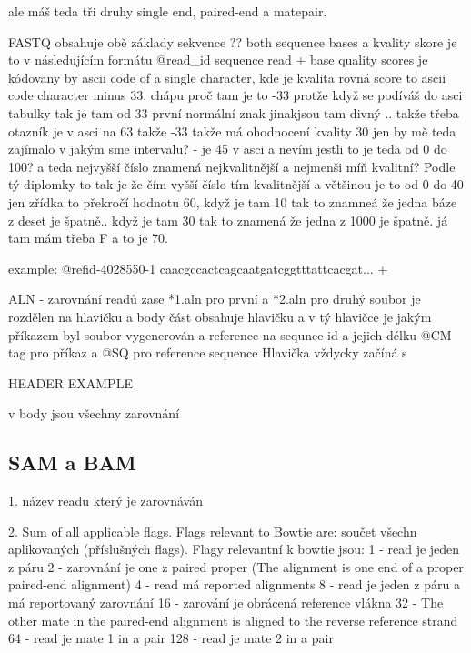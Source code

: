 \documentclass[czech,DP]{thesiskiv}
\numberwithin{equation}{section}
\begin{document}
ale máš teda tři druhy single end, paired-end a matepair. 

FASTQ obsahuje obě základy sekvence ?? both sequence bases a kvality skore je to v následujícím formátu
@read\_id
sequence read
+
base quality scores je kódovany by ascii code of a single character, kde je kvalita rovná score to ascii code character minus 33. chápu proč tam je to -33 protže když se podíváš do asci tabulky tak je tam od 33 první normální znak jinakjsou tam divný .. 
takže třeba otazník je v asci na 63 takže -33 takže má ohodnocení kvality 30
jen by mě teda zajímalo v jakým sme intervalu? - je 45 v asci a nevím jestli to je teda od 0 do 100?  a teda nejvyšší číslo znamená nejkvalitnější a nejmenši míň kvalitní? Podle tý diplomky to tak je že čím vyšší číslo tím kvalitnější a většinou je to od 0 do 40 jen zřídka to překročí hodnotu 60, když je tam 10 tak to znamneá že jedna báze z deset je špatně.. když je tam 30 tak to znamená že jedna z 1000 je špatně.
já tam mám třeba F a to je 70.

example:
		@refid-4028550-1 
		caacgccactcagcaatgatcggtttattcacgat...
		+ 

ALN - zarovnání readů
zase *1.aln pro první a *2.aln pro druhý
soubor je rozdělen na hlavičku a body část
obsahuje hlavičku a v tý hlavičce je jakým příkazem byl soubor vygenerován a reference na sequnce id a jejich délku
@CM tag pro příkaz a
@SQ pro reference sequence
Hlavička vždycky začíná s 

		HEADER EXAMPLE

		
v body jsou všechny zarovnání 

\subsection{SAM a BAM}
1. název readu který je zarovnáván

2. Sum of all applicable flags. Flags relevant to Bowtie are:
součet všechn aplikovaných (příslušných flags). Flagy relevantní k bowtie jsou: 
1 - read je jeden z páru
2 - zarovnání je one z paired proper (The alignment is one end of a proper paired-end alignment)
4 - read má reported alignments
8 - read je jeden z páru a má reportovaný zarovnání
16 - zarování je obrácená reference vlákna
32 - The other mate in the paired-end alignment is aligned to the reverse reference strand
64 - read je mate 1 in a pair
128 - read je mate 2 in a pair
\end{document}
